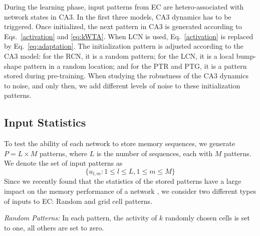 \documentclass[utf8]{frontiersSCNS} %
\begin{document}
During the learning phase, input patterns from EC are hetero-associated with network states in CA3. In the first three models, CA3 dynamics has to be triggered. Once initialized, the next pattern in CA3 is generated according to Eqs.~\ref{activation} and \ref{eq:kWTA}. When LCN is used, Eq.~\ref{activation} is replaced by Eq.~\ref{eq:adaptation}. The initialization pattern is adjusted according to the CA3 model: for the RCN, it is a random pattern; for the LCN, it is a local bump-shape pattern in a random location; and for the PTR and PTG, it is a pattern stored during pre-training. When studying the robustness of the CA3 dynamics to noise, and only then, we add different levels of noise to these initialization patterns.

\subsection{Input Statistics}

To test the ability of each network to store memory sequences, we generate $P = L \times M$ patterns, where $L$ is the number of sequences, each with $M$ patterns. We denote the set of input patterns as 
\begin{equation}
	\{ u_{l,m}: 1\le l \le L, 1\le m \le M \}
\end{equation}
Since we recently found that the statistics of the stored patterns have a large impact on the memory performance of a network \cite{neher2015memory}, we consider two different types of inputs to EC: Random and grid cell \cite{hafting2005microstructure} patterns. 


\textit{Random Patterns:} 
In each pattern, the activity of $k$ randomly chosen cells is set to one, all others are set to zero. 
\end{document}
